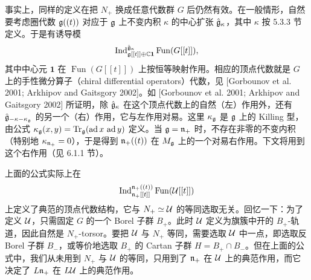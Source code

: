 事实上，同样的定义在把 $N_+$ 换成任意代数群 $G$ 后仍然有效。在一般情形，自然要考虑圈代数 $\mathfrak{g}((t))$ 对应于 $\mathfrak{g}$ 上不变内积 $\kappa$ 的中心扩张 $\hat{\mathfrak{g}}_\kappa$，其中 $\kappa$ 按 5.3.3 节定义。于是有诱导模
\[
\operatorname{Ind}_{\mathfrak{g}[[t]]\oplus\mathbb{C}\mathbf{1}}^{\hat{\mathfrak{g}}_\kappa}\operatorname{Fun}(G[[t]]),
\]
其中中心元 $\mathbf{1}$ 在 $\operatorname{Fun}(G[[t]])$ 上按恒等映射作用。相应的顶点代数就是 $G$ 上的手性微分算子（chiral differential operators）代数，见 [Gorbounov et al. 2001; Arkhipov and Gaitsgory 2002]。如 [Gorbounov et al. 2001; Arkhipov and Gaitsgory 2002] 所证明，除 $\hat{\mathfrak{g}}_\kappa$ 在这个顶点代数上的自然（左）作用外，还有 $\hat{\mathfrak{g}}_{-\kappa-\kappa_{\mathfrak{g}}}$ 的另一个（右）作用，它与左作用对易。这里 $\kappa_{\mathfrak{g}}$ 是 $\mathfrak{g}$ 上的 Killing 型，由公式 $\kappa_{\mathfrak{g}}(x,y) = \operatorname{Tr}_{\mathfrak{g}}(\operatorname{ad}x\,\operatorname{ad}y)$ 定义。当 $\mathfrak{g}=\mathfrak{n}_+$ 时，不存在非零的不变内积（特别地 $\kappa_{\mathfrak{n}_+}=0$），于是得到 $\mathfrak{n}_+((t))$ 在 $M_{\mathfrak{g}}$ 上的一个对易右作用。下文将用到这个右作用（见 6.1.1 节）。


上面的公式实际上在
\[
\operatorname{Ind}_{\mathfrak{n}_+[[t]]}^{\mathfrak{n}_+((t))}\operatorname{Fun}(\mathcal{U}[[t]])
\]
上定义了典范的顶点代数结构，它与 $N_+\simeq\mathcal{U}$ 的等同选取无关。回忆一下：为了定义 $\mathcal{U}$，只需固定 $G$ 的一个 Borel 子群 $B_+$。此时 $\mathcal{U}$ 定义为旗簇中开的 $B_+$-轨道，因此自然是 $N_+$-torsor。要把 $\mathcal{U}$ 与 $N_+$ 等同，需要选取 $\mathcal{U}$ 中一点，即选取反 Borel 子群 $B_-$，或等价地选取 $B_+$ 的 Cartan 子群 $H = B_+\cap B_-$。但在上面的公式中，我们从未用到 $N_+$ 与 $\mathcal{U}$ 的等同，只用到了 $\mathfrak{n}_+$ 在 $\mathcal{U}$ 上的典范作用，而它决定了 $L\mathfrak{n}_+$ 在 $L\mathcal{U}$ 上的典范作用。


